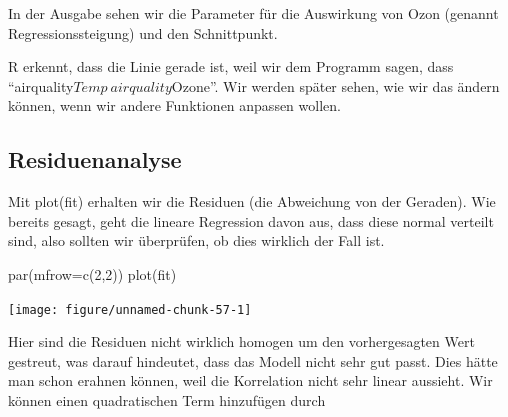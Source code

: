 \documentclass[a4paper,twoside]{tufte-book}\usepackage[]{graphicx}\usepackage[]{color}
\begin{document}
\begin{appendices}
\begin{Schunk}
\end{Schunk}

In der Ausgabe sehen wir die Parameter für die Auswirkung von Ozon (genannt Regressionssteigung) und den Schnittpunkt.

R erkennt, dass die Linie gerade ist, weil wir dem Programm sagen, dass "`airquality$Temp~airquality$Ozone"'. Wir werden später sehen, wie wir das ändern können, wenn wir andere Funktionen anpassen wollen. 

\subsection{Residuenanalyse}

Mit plot(fit) erhalten wir die Residuen (die Abweichung von der Geraden). Wie bereits gesagt, geht die lineare Regression davon aus, dass diese normal verteilt sind, also sollten wir überprüfen, ob dies wirklich der Fall ist.

\begin{Schunk}
\begin{Sinput}
par(mfrow=c(2,2))
plot(fit)
\end{Sinput}

\texttt{[image: figure/unnamed-chunk-57-1]} \end{Schunk}

Hier sind die Residuen nicht wirklich homogen um den vorhergesagten Wert gestreut, was darauf hindeutet, dass das Modell nicht sehr gut passt. Dies hätte man schon erahnen können, weil die Korrelation nicht sehr linear aussieht. Wir können einen quadratischen Term hinzufügen durch

\begin{Schunk}
\begin{Soutput}


\end{Soutput}
\end{Schunk}
\end{appendices}
\end{document}
